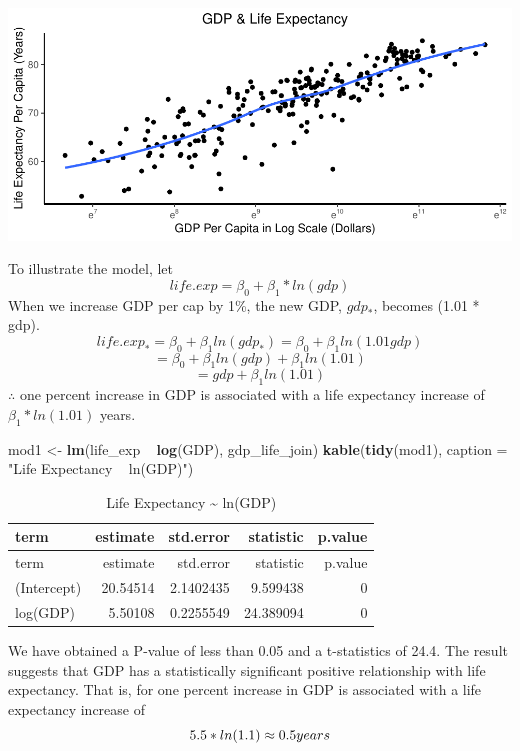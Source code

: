 \documentclass[
]{article}
\newenvironment{Shaded}{\begin{snugshade}}{\end{snugshade}}
\newcommand{\DataTypeTok}[1]{\textcolor[rgb]{0.00,0.34,0.68}{#1}}
\newcommand{\KeywordTok}[1]{\textcolor[rgb]{0.12,0.11,0.11}{\textbf{#1}}}
\newcommand{\NormalTok}[1]{\textcolor[rgb]{0.12,0.11,0.11}{#1}}
\newcommand{\OperatorTok}[1]{\textcolor[rgb]{0.12,0.11,0.11}{#1}}
\newcommand{\StringTok}[1]{\textcolor[rgb]{0.75,0.01,0.01}{#1}}
\begin{document}
\includegraphics{final_report_files/figure-latex/unnamed-chunk-8-1.pdf}

To illustrate the model, let
\[life.exp = \beta_{0}+\beta_{1} * ln(gdp)\] When we increase GDP per
cap by 1\%, the new GDP, \(gdp_*\), becomes (1.01 * gdp).
\[life.exp_* = \beta_{0}+\beta_{1}  ln(gdp_*) = \beta_{0}+\beta_{1}  ln(1.01gdp)\]
\[= \beta_{0} +  \beta_{1}ln(gdp) + \beta_{1}ln(1.01)\]
\[= gdp + \beta_{1}  ln(1.01)\] \(\therefore\) one percent increase in
GDP is associated with a life expectancy increase of
\(\beta_{1} * ln(1.01)\) years.

\begin{Shaded}
\begin{Highlighting}[]
\NormalTok{mod1 <-}\StringTok{ }\KeywordTok{lm}\NormalTok{(life_exp }\OperatorTok{~}\StringTok{ }\KeywordTok{log}\NormalTok{(GDP), gdp_life_join)}
\KeywordTok{kable}\NormalTok{(}\KeywordTok{tidy}\NormalTok{(mod1), }\DataTypeTok{caption =} \StringTok{"Life Expectancy ~ ln(GDP)"}\NormalTok{)}
\end{Highlighting}
\end{Shaded}

\begin{longtable}[]{@{}lrrrr@{}}
\caption{Life Expectancy \textasciitilde{} ln(GDP)}\tabularnewline
\toprule
term & estimate & std.error & statistic & p.value\tabularnewline
\midrule
\endfirsthead
\toprule
term & estimate & std.error & statistic & p.value\tabularnewline
\midrule
\endhead
(Intercept) & 20.54514 & 2.1402435 & 9.599438 & 0\tabularnewline
log(GDP) & 5.50108 & 0.2255549 & 24.389094 & 0\tabularnewline
\bottomrule
\end{longtable}

We have obtained a P-value of less than 0.05 and a t-statistics of 24.4.
The result suggests that GDP has a statistically significant positive
relationship with life expectancy. That is, for one percent increase in
GDP is associated with a life expectancy increase of
\[5.5 * ln(1.1) \approx 0.5 \space years\]
\end{document}
